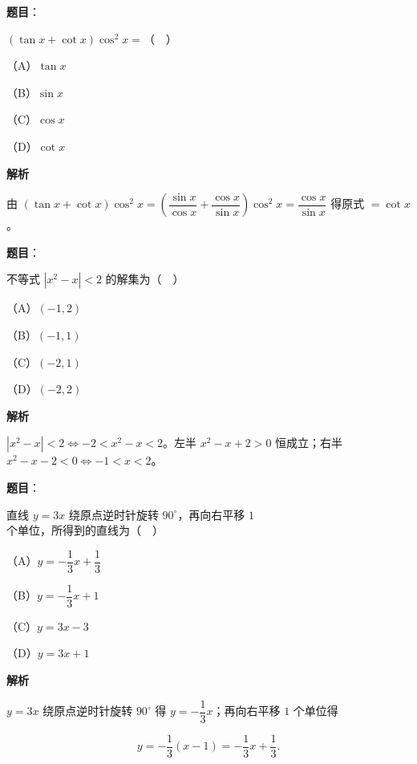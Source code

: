 \begin{answer}

\textbf{题目}：

$(\tan x+\cot x)\cos^2x=$（　）

（A）$\tan x$

（B）$\sin x$

（C）$\cos x$

（D）$\cot x$

\textbf{解析}

由 $(\tan x+\cot x)\cos^2x=\left(\dfrac{\sin x}{\cos x}+\dfrac{\cos x}{\sin x}\right)\cos^2x=\dfrac{\cos x}{\sin x}$ 得原式 $=\cot x$。


\end{answer}
\begin{answer}

\textbf{题目}：

不等式 $|x^2-x|<2$ 的解集为（　）

（A）$(-1,2)$

（B）$(-1,1)$

（C）$(-2,1)$

（D）$(-2,2)$

\textbf{解析}

$|x^2-x|<2\iff-2<x^2-x<2$。左半 $x^2-x+2>0$ 恒成立；右半 $x^2-x-2<0\iff-1<x<2$。


\end{answer}
\begin{answer}

\textbf{题目}：

直线 $y=3x$ 绕原点逆时针旋转 $90^\circ$，再向右平移 $1$ 个单位，所得到的直线为（　）

（A）$y=-\dfrac13x+\dfrac13$

（B）$y=-\dfrac13x+1$

（C）$y=3x-3$

（D）$y=3x+1$

\textbf{解析}

$y=3x$ 绕原点逆时针旋转 $90^\circ$ 得 $y=-\dfrac13x$；再向右平移 $1$ 个单位得

\nopagebreak[4]
\[y=-\frac13(x-1)=-\frac13x+\frac13.\]


\end{answer}
